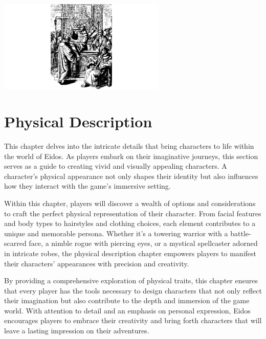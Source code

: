 \documentclass[12pt]{book}
\begin{document}
\begin{center}
    \includegraphics[width=0.6\textwidth]{./images/religion06.pdf}
\end{center}


\chapter{Physical Description}

This chapter delves into the intricate details that bring characters to life within the world of Eidos. As players embark on their imaginative journeys, this section serves as a guide to creating vivid and visually appealing characters. A character's physical appearance not only shapes their identity but also influences how they interact with the game's immersive setting.

Within this chapter, players will discover a wealth of options and considerations to craft the perfect physical representation of their character. From facial features and body types to hairstyles and clothing choices, each element contributes to a unique and memorable persona. Whether it's a towering warrior with a battle-scarred face, a nimble rogue with piercing eyes, or a mystical spellcaster adorned in intricate robes, the physical description chapter empowers players to manifest their characters' appearances with precision and creativity.

By providing a comprehensive exploration of physical traits, this chapter ensures that every player has the tools necessary to design characters that not only reflect their imagination but also contribute to the depth and immersion of the game world. With attention to detail and an emphasis on personal expression, Eidos encourages players to embrace their creativity and bring forth characters that will leave a lasting impression on their adventures.
\end{document}

